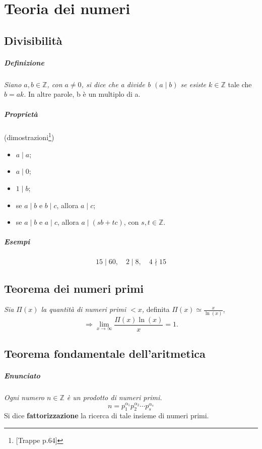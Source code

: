 \documentclass[a4paper]{report}
\begin{document}
\chapter{Teoria dei numeri}
\section{Divisibilità}
\paragraph{Definizione}
\textit{Siano $a,b\in \mathbb{Z}$, con $a\neq 0$, si dice che a divide b $(a\mid b)$ se esiste $k\in \mathbb{Z}$} tale che $b=ak$. In altre parole, b è un multiplo di a.
\paragraph{Proprietà} (dimostrazioni\footnote{[Trappe p.64]})
\begin{itemize}
\item $a\mid a$;
\item $a\mid 0$;
\item $1\mid b$;
\item se $a\mid b$ e $b\mid c$, allora $a\mid c$;
\item se $a\mid b$ e $a\mid c$, allora $a\mid (sb + tc)$, con $s,t\in \mathbb{Z}$.
\end{itemize}
\paragraph{Esempi}
$$15\mid 60,\quad 2\mid 8,\quad 4\nmid 15$$
\section{Teorema dei numeri primi}
\textit{Sia $\Pi (x)$ la quantità di numeri primi $<x$,} definita $\Pi (x) \simeq \frac{x}{\ln{(x)}}$,
$$\Rightarrow \lim_{x\to\infty} \frac{\Pi (x)\ln{(x)}}{x}=1.$$
\section{Teorema fondamentale dell'aritmetica}
\paragraph{Enunciato} \textit{Ogni numero $n\in \mathbb{Z}$ è un prodotto di numeri primi.}
$$n=p_1^{\alpha _1}p_2^{\alpha _2}\cdots p_s^{\alpha _s}$$
Si dice \textbf{fattorizzazione} la ricerca di tale insieme di numeri primi.
\end{document}
